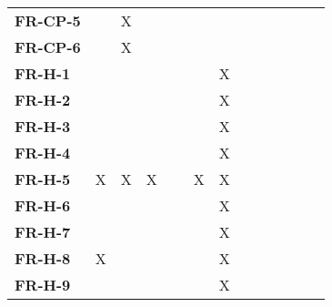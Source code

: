\documentclass[12pt, titlepage]{article}
\begin{document}
\begin{table}[H]
\begin{adjustbox}{max width=0.7\paperwidth}
\begin{tabular}{l|ccccccccccc}
        \textbf{FR-CP-5}   & ~ & X & ~ & ~ & ~ & ~ & ~ & ~\\
        \textbf{FR-CP-6}   & ~ & X & ~ & ~ & ~ & ~ & ~ & ~\\
        \textbf{FR-H-1}    & ~ & ~ & ~ & ~ & ~ & X & ~ & ~\\
        \textbf{FR-H-2}    & ~ & ~ & ~ & ~ & ~ & X & ~ & ~\\
        \textbf{FR-H-3}    & ~ & ~ & ~ & ~ & ~ & X & ~ & ~\\
        \textbf{FR-H-4}    & ~ & ~ & ~ & ~ & ~ & X & ~ & ~\\
        \textbf{FR-H-5}    & X & X & X & ~ & X & X & ~ & ~\\
        \textbf{FR-H-6}    & ~ & ~ & ~ & ~ & ~ & X & ~ & ~\\
        \textbf{FR-H-7}    & ~ & ~ & ~ & ~ & ~ & X & ~ & ~\\
        \textbf{FR-H-8}    & X & ~ & ~ & ~ & ~ & X & ~ & ~\\
        \textbf{FR-H-9}    & ~ & ~ & ~ & ~ & ~ & X & ~ & ~\\
    \end{tabular}
    \end{adjustbox}
    \label{Traceability Matrix: Functional Requirement}
\end{table}
\end{document}
